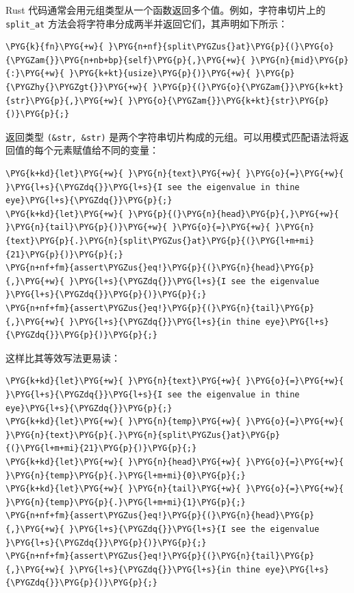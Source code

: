Rust 代码通常会用元组类型从一个函数返回多个值。例如，字符串切片上的 \texttt{split\_at} 方法会将字符串分成两半并返回它们，其声明如下所示：

\begin{Verbatim}[commandchars=\\\{\},breaklines=true,breakanywhere=true,fontsize=\codefont,xleftmargin=17bp]
\PYG{k}{fn}\PYG{+w}{ }\PYG{n+nf}{split\PYGZus{}at}\PYG{p}{(}\PYG{o}{\PYGZam{}}\PYG{n+nb+bp}{self}\PYG{p}{,}\PYG{+w}{ }\PYG{n}{mid}\PYG{p}{:}\PYG{+w}{ }\PYG{k+kt}{usize}\PYG{p}{)}\PYG{+w}{ }\PYG{p}{\PYGZhy{}\PYGZgt{}}\PYG{+w}{ }\PYG{p}{(}\PYG{o}{\PYGZam{}}\PYG{k+kt}{str}\PYG{p}{,}\PYG{+w}{ }\PYG{o}{\PYGZam{}}\PYG{k+kt}{str}\PYG{p}{)}\PYG{p}{;}
\end{Verbatim}

返回类型 \texttt{(\&str, \&str)} 是两个字符串切片构成的元组。可以用模式匹配语法将返回值的每个元素赋值给不同的变量：

\begin{Verbatim}[commandchars=\\\{\},breaklines=true,breakanywhere=true,fontsize=\codefont,xleftmargin=17bp]
\PYG{k+kd}{let}\PYG{+w}{ }\PYG{n}{text}\PYG{+w}{ }\PYG{o}{=}\PYG{+w}{ }\PYG{l+s}{\PYGZdq{}}\PYG{l+s}{I see the eigenvalue in thine eye}\PYG{l+s}{\PYGZdq{}}\PYG{p}{;}
\PYG{k+kd}{let}\PYG{+w}{ }\PYG{p}{(}\PYG{n}{head}\PYG{p}{,}\PYG{+w}{ }\PYG{n}{tail}\PYG{p}{)}\PYG{+w}{ }\PYG{o}{=}\PYG{+w}{ }\PYG{n}{text}\PYG{p}{.}\PYG{n}{split\PYGZus{}at}\PYG{p}{(}\PYG{l+m+mi}{21}\PYG{p}{)}\PYG{p}{;}
\PYG{n+nf+fm}{assert\PYGZus{}eq!}\PYG{p}{(}\PYG{n}{head}\PYG{p}{,}\PYG{+w}{ }\PYG{l+s}{\PYGZdq{}}\PYG{l+s}{I see the eigenvalue }\PYG{l+s}{\PYGZdq{}}\PYG{p}{)}\PYG{p}{;}
\PYG{n+nf+fm}{assert\PYGZus{}eq!}\PYG{p}{(}\PYG{n}{tail}\PYG{p}{,}\PYG{+w}{ }\PYG{l+s}{\PYGZdq{}}\PYG{l+s}{in thine eye}\PYG{l+s}{\PYGZdq{}}\PYG{p}{)}\PYG{p}{;}
\end{Verbatim}

这样比其等效写法更易读：

\begin{Verbatim}[commandchars=\\\{\},breaklines=true,breakanywhere=true,fontsize=\codefont,xleftmargin=17bp]
\PYG{k+kd}{let}\PYG{+w}{ }\PYG{n}{text}\PYG{+w}{ }\PYG{o}{=}\PYG{+w}{ }\PYG{l+s}{\PYGZdq{}}\PYG{l+s}{I see the eigenvalue in thine eye}\PYG{l+s}{\PYGZdq{}}\PYG{p}{;}
\PYG{k+kd}{let}\PYG{+w}{ }\PYG{n}{temp}\PYG{+w}{ }\PYG{o}{=}\PYG{+w}{ }\PYG{n}{text}\PYG{p}{.}\PYG{n}{split\PYGZus{}at}\PYG{p}{(}\PYG{l+m+mi}{21}\PYG{p}{)}\PYG{p}{;}
\PYG{k+kd}{let}\PYG{+w}{ }\PYG{n}{head}\PYG{+w}{ }\PYG{o}{=}\PYG{+w}{ }\PYG{n}{temp}\PYG{p}{.}\PYG{l+m+mi}{0}\PYG{p}{;}
\PYG{k+kd}{let}\PYG{+w}{ }\PYG{n}{tail}\PYG{+w}{ }\PYG{o}{=}\PYG{+w}{ }\PYG{n}{temp}\PYG{p}{.}\PYG{l+m+mi}{1}\PYG{p}{;}
\PYG{n+nf+fm}{assert\PYGZus{}eq!}\PYG{p}{(}\PYG{n}{head}\PYG{p}{,}\PYG{+w}{ }\PYG{l+s}{\PYGZdq{}}\PYG{l+s}{I see the eigenvalue }\PYG{l+s}{\PYGZdq{}}\PYG{p}{)}\PYG{p}{;}
\PYG{n+nf+fm}{assert\PYGZus{}eq!}\PYG{p}{(}\PYG{n}{tail}\PYG{p}{,}\PYG{+w}{ }\PYG{l+s}{\PYGZdq{}}\PYG{l+s}{in thine eye}\PYG{l+s}{\PYGZdq{}}\PYG{p}{)}\PYG{p}{;}
\end{Verbatim}

